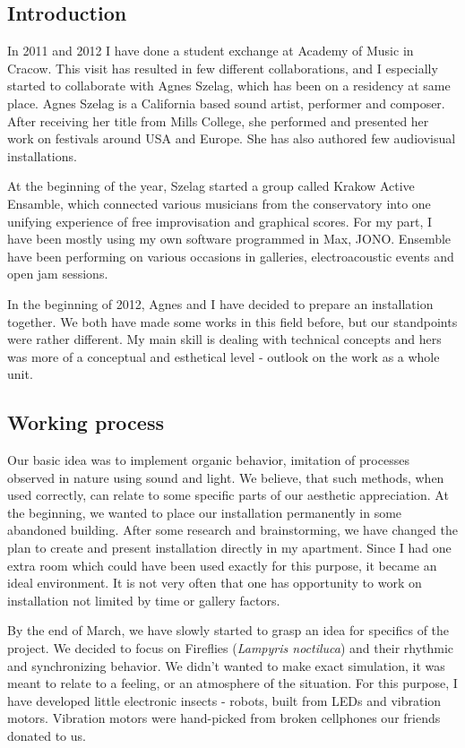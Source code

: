 \documentclass[12pt,a4paper,oneside]{report}
\begin{document}
\subsection{Introduction} In 2011 and 2012 I have done a student exchange at Academy of Music in Cracow. This visit has resulted in few different collaborations, and I especially started to collaborate with Agnes Szelag, which has been on a residency at same place. Agnes Szelag is a California based sound artist, performer and composer. After receiving her title from Mills College, she performed and presented her work on festivals around USA and Europe. She has also authored few audiovisual installations. 

At the beginning of the year, Szelag started a group called Krakow Active Ensamble, which connected various musicians from the conservatory into one unifying experience of free improvisation and graphical scores. For my part, I have been mostly using my own software programmed in Max, JONO. Ensemble have been performing on various occasions in galleries, electroacoustic events and open jam sessions.

In the beginning of 2012, Agnes and I have decided to prepare an installation together. We both have made some works in this field before, but our standpoints were rather different. My main skill is dealing with technical concepts and hers was more of a conceptual and esthetical level - outlook on the work as a whole unit. 

\subsection{Working process} Our basic idea was to implement organic behavior, imitation of processes observed in nature using sound and light. We believe, that such methods, when used correctly, can relate to some specific parts of our aesthetic appreciation. At the beginning, we wanted to place our installation permanently in some abandoned building. After some research and brainstorming, we have changed the plan to create and present installation directly in my apartment. Since I had one extra room which could have been used exactly for this purpose, it became an ideal environment. It is not very often that one has opportunity to work on installation not limited by time or gallery factors.

By the end of March, we have slowly started to grasp an idea for specifics of the project. We decided to focus on Fireflies (\emph{Lampyris noctiluca}) and their rhythmic and synchronizing behavior. We didn't wanted to make exact simulation, it was meant to relate to a feeling, or an atmosphere of the situation. For this purpose, I have developed little electronic insects - robots, built from LEDs and vibration motors. Vibration motors were hand-picked from broken cellphones our friends donated to us. 
\end{document}
